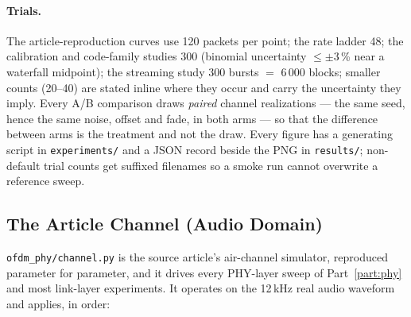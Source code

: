 \paragraph{Trials.}  The article-reproduction curves use 120 packets
per point; the rate ladder 48; the calibration and code-family
studies 300 (binomial uncertainty $\le\pm3$\,\% near a waterfall
midpoint); the streaming study 300 bursts $=$ 6\,000 blocks; smaller
counts (20--40) are stated inline where they occur and carry the
uncertainty they imply.  Every A/B comparison draws \emph{paired}
channel realizations --- the same seed, hence the same noise, offset
and fade, in both arms --- so that the difference between arms is the
treatment and not the draw.  Every figure has a generating script in
\texttt{experiments/} and a JSON record beside the PNG in
\texttt{results/}; non-default trial counts get suffixed filenames so a
smoke run cannot overwrite a reference sweep.

\subsection{The Article Channel (Audio Domain)}
\label{sec:chan_article}

\texttt{ofdm\_phy/channel.py} is the source article's air-channel
simulator, reproduced parameter for parameter, and it drives every
PHY-layer sweep of Part~\ref{part:phy} and most link-layer experiments.
It operates on the 12\,kHz real audio waveform and applies, in order:

